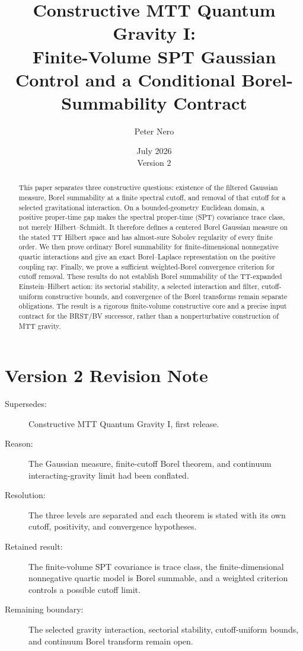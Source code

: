 \documentclass[11pt]{article}
\title{Constructive MTT Quantum Gravity I:\\
\large Finite-Volume SPT Gaussian Control and a Conditional Borel-Summability Contract}
\author{Peter Nero}
\date{July 2026\\Version 2}
\begin{document}
\maketitle

\begin{abstract}
This paper separates three constructive questions: existence of the filtered
Gaussian measure, Borel summability at a finite spectral cutoff, and removal
of that cutoff for a selected gravitational interaction.
On a bounded-geometry Euclidean domain, a positive proper-time gap makes the
spectral proper-time (SPT) covariance trace class, not merely Hilbert--Schmidt. It
therefore defines a centered Borel Gaussian measure on the stated TT Hilbert space
and has almost-sure Sobolev regularity of every finite order. We then prove ordinary
Borel summability for finite-dimensional nonnegative quartic interactions and give an
exact Borel--Laplace representation on the positive coupling ray. Finally, we prove
a sufficient weighted-Borel convergence criterion for cutoff removal. These results
do not establish Borel summability of the TT-expanded Einstein--Hilbert action: its
sectorial stability, a selected interaction and filter, cutoff-uniform constructive
bounds, and convergence of the Borel transforms remain separate obligations. The
result is a rigorous finite-volume constructive core and a precise input contract for
the BRST/BV successor, rather than a nonperturbative construction of MTT gravity.
\end{abstract}

\section*{Version 2 Revision Note}
\begin{description}
\item[Supersedes:] Constructive MTT Quantum Gravity I, first release.
\item[Reason:] The Gaussian measure, finite-cutoff Borel theorem, and
continuum interacting-gravity limit had been conflated.
\item[Resolution:] The three levels are separated and each theorem is stated
with its own cutoff, positivity, and convergence hypotheses.
\item[Retained result:] The finite-volume SPT covariance is trace class, the
finite-dimensional nonnegative quartic model is Borel summable, and a
weighted criterion controls a possible cutoff limit.
\item[Remaining boundary:] The selected gravity interaction, sectorial
stability, cutoff-uniform bounds, and continuum Borel transform remain open.
\end{description}
\end{document}
